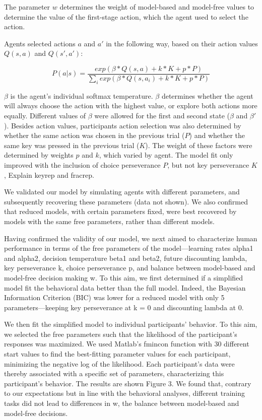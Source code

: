 \documentclass[11pt]{article} %
\begin{document}
The parameter $w$ determines the weight of model-based and model-free values to determine the value of the first-stage action, which the agent used to select the action.

Agents selected actions $a$ and $a'$ in the following way, based on their action values $Q(s, a)$ and $Q(s', a')$:

\begin{equation}
P(a|s) = \frac{exp(\beta * Q(s, a) + k * K + p * P)}{\sum_{i} exp(\beta * Q(s, a_{i}) + k * K + p * P)}
\end{equation}

$\beta$ is the agent's individual softmax temperature. $\beta$ determines whether the agent will always choose the action with the highest value, or explore both actions more equally. Different values of $\beta$ were allowed for the first and second state ($\beta$ and $\beta'$). Besides action values, participants action selection was also determined by whether the same action was chosen in the previous trial ($P$) and whether the same key was pressed in the previous trial ($K$). The weight of these factors were determined by weights $p$ and $k$, which varied by agent. The model fit only improved with the inclusion of choice perseverance $P$, but not key perseverance $K$, 
Explain keyrep and fracrep.

We validated our model by simulating agents with different parameters, and subsequently recovering these parameters (data not shown). We also confirmed that reduced models, with certain parameters fixed, were best recovered by models with the same free parameters, rather than different models. 

Having confirmed the validity of our model, we next aimed to characterize human performance in terms of the free parameters of the model---learning rates alpha1 and alpha2, decision temperature beta1 and beta2, future discounting lambda, key perseverance k, choice perseverance p, and balance between model-based and model-free decision making w. To this aim, we first determined if a simplified model fit the behavioral data better than the full model. Indeed, the Bayesian Information Criterion (BIC) was lower for a reduced model with only 5 parameters---keeping key perseverance at k = 0 and discounting lambda at 0.

We then fit the simplified model to individual participants' behavior. To this aim, we selected the free parameters such that the likelihood of the participant's responses was maximized. We used Matlab's fmincon function with 30 different start values to find the best-fitting parameter values for each participant, minimizing the negative log of the likelihood. Each participant's data were thereby associated with a specific set of parameters, characterizing this participant's behavior. The results are shown Figure 3. We found that, contrary to our expectations but in line with the behavioral analyses, different training tasks did not lead to differences in w, the balance between model-based and model-free decisions. 
\end{document}
